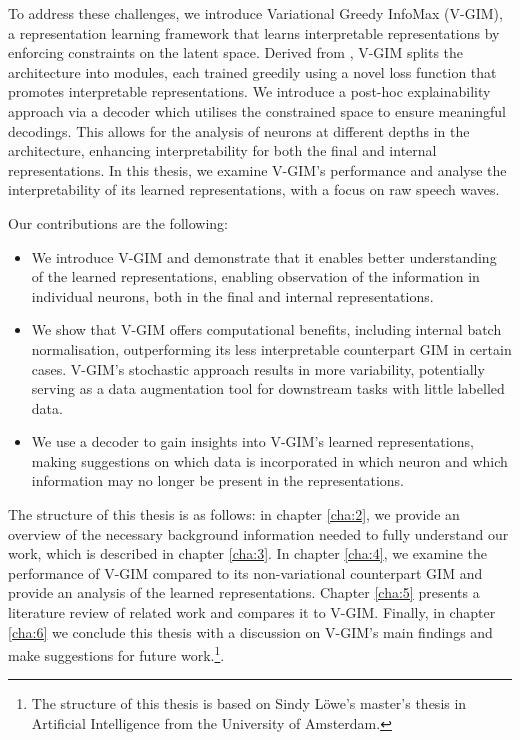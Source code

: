 To address these challenges, we introduce Variational Greedy InfoMax (V-GIM), a representation learning framework that learns interpretable representations by enforcing constraints on the latent space. Derived from \cite{lowePuttingEndEndtoEnd2020a}, V-GIM splits the architecture into modules, each trained greedily using a novel loss function that promotes interpretable representations. We introduce a post-hoc explainability approach via a decoder which utilises the constrained space to ensure meaningful decodings. This allows for the analysis of neurons at different depths in the architecture, enhancing interpretability for both the final and internal representations. In this thesis, we examine V-GIM's performance and analyse the interpretability of its learned representations, with a focus on raw speech waves.


Our contributions are the following:
\begin{itemize}
	\item We introduce V-GIM and demonstrate that it enables better understanding of the learned representations, enabling observation of the information in individual neurons, both in the final and internal representations. %
	\item We show that V-GIM offers computational benefits, including internal batch normalisation, outperforming its less interpretable counterpart GIM in certain cases. V-GIM's stochastic approach results in more variability, potentially serving as a data augmentation tool for downstream tasks with little labelled data.
	\item We use a decoder to gain insights into V-GIM's learned representations, making suggestions on which data is incorporated in which neuron and which information may no longer be present in the representations.
\end{itemize}




The structure of this thesis is as follows: in chapter \ref{cha:2}, we provide an overview of the necessary background information needed to fully understand our work, which is described in chapter \ref{cha:3}. In chapter \ref{cha:4}, we examine the performance of V-GIM compared to its non-variational counterpart GIM and provide an analysis of the learned representations. Chapter \ref{cha:5} presents a literature review of related work and compares it to V-GIM. Finally, in chapter \ref{cha:6} we conclude this thesis with a discussion on V-GIM's main findings and make suggestions for future work.\footnote{The structure of this thesis is based on Sindy Löwe's master's thesis in Artificial Intelligence from the University of Amsterdam.}. 



